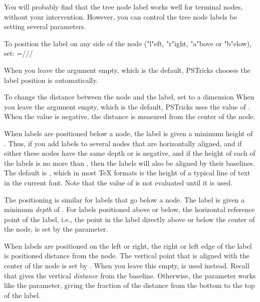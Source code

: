 \documentclass[fontsize=11pt,english,BCOR=10mm,DIV=12,bibliography=totoc,parskip=false,
   headings=small, headinclude=false,footinclude=false,oneside]{pst-doc}
\begin{document}
You will probably find that the tree node label works well for terminal nodes,
without your intervention. However, you can control the tree node labels be
setting several parameters.

To position the label on any side of the node ("l"eft, "r"ight, "a"bove or
"b"elow), set:  =///

\begin{LTXexample}[pos=l,width=0.4\linewidth]
\end{LTXexample}

When you leave the argument empty, which is the default, PSTricks chooses the
label position is automatically.

To change the distance between the node and the label, set  to a dimension
When you leave the argument empty, which is the default, PSTricks uses the
value of . When the value is negative, the distance is measured
from the center of the node.

When labels are positioned below a node, the label is given a minimum height
of .
Thus, if you add labels to several nodes that are horizontally aligned, and if
either these nodes have the same depth or  is negative, and if the
height of each of the labels is no more than , then the labels
will also be aligned by their baselines. The default is , which
in most \TeX{} formats is the height of a typical line of text in the current
font. Note that the value of  is not evaluated until it is used.

The positioning is similar for labels that go below a node. The label is given
a minimum \emph{depth} of .
For labels positioned above or below, the horizontal reference point of the
label, i.e., the point in the label directly above or below the center of the
node, is set by the  parameter.

When labels are positioned on the left or right, the right or left edge of the
label is positioned distance  from the node. The vertical point that
is aligned with the center of the node is set by .
When you leave this empty,  is used instead. Recall that 
gives the vertical \emph{distance} from the baseline. Otherwise, the
 parameter works like the  parameter, giving the fraction of
the distance from the bottom to the top of the label.
\end{document}
